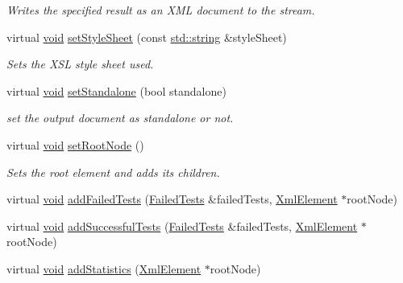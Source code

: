 \begin{DoxyCompactItemize}
\begin{DoxyCompactList}\small\item\em Writes the specified result as an X\-M\-L document to the stream. \end{DoxyCompactList}\item 
virtual \hyperlink{wglew_8h_aeea6e3dfae3acf232096f57d2d57f084}{void} \hyperlink{class_xml_outputter_af6e681ba18061b5b8dd6f37614ab556e}{set\-Style\-Sheet} (const \hyperlink{glew_8h_ae84541b4f3d8e1ea24ec0f466a8c568b}{std\-::string} \&style\-Sheet)
\begin{DoxyCompactList}\small\item\em Sets the X\-S\-L style sheet used. \end{DoxyCompactList}\item 
virtual \hyperlink{wglew_8h_aeea6e3dfae3acf232096f57d2d57f084}{void} \hyperlink{class_xml_outputter_aee5fd34688999cef1d04e48b4e9b695e}{set\-Standalone} (bool standalone)
\begin{DoxyCompactList}\small\item\em set the output document as standalone or not. \end{DoxyCompactList}\item 
virtual \hyperlink{wglew_8h_aeea6e3dfae3acf232096f57d2d57f084}{void} \hyperlink{class_xml_outputter_a902bd7f9c9968ea311e4da3437a37b3e}{set\-Root\-Node} ()
\begin{DoxyCompactList}\small\item\em Sets the root element and adds its children. \end{DoxyCompactList}\item 
virtual \hyperlink{wglew_8h_aeea6e3dfae3acf232096f57d2d57f084}{void} \hyperlink{class_xml_outputter_a8675cbea5b79eea10f41d0ab05379421}{add\-Failed\-Tests} (\hyperlink{class_xml_outputter_a987608d04ba56dcc13461c9522f3da7e}{Failed\-Tests} \&failed\-Tests, \hyperlink{class_xml_element}{Xml\-Element} $\ast$root\-Node)
\item 
virtual \hyperlink{wglew_8h_aeea6e3dfae3acf232096f57d2d57f084}{void} \hyperlink{class_xml_outputter_a57805372b9f3ceeafd43a1e637f8b888}{add\-Successful\-Tests} (\hyperlink{class_xml_outputter_a987608d04ba56dcc13461c9522f3da7e}{Failed\-Tests} \&failed\-Tests, \hyperlink{class_xml_element}{Xml\-Element} $\ast$root\-Node)
\item 
virtual \hyperlink{wglew_8h_aeea6e3dfae3acf232096f57d2d57f084}{void} \hyperlink{class_xml_outputter_a8ba291b109ac04b9f652c027c3318f14}{add\-Statistics} (\hyperlink{class_xml_element}{Xml\-Element} $\ast$root\-Node)

\end{DoxyCompactItemize}
